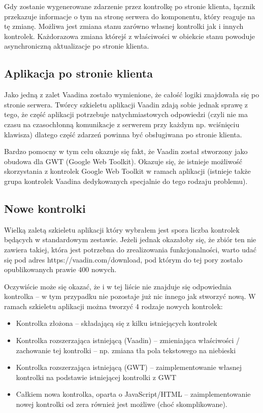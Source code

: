 Gdy zostanie wygenerowane zdarzenie przez kontrolkę po stronie klienta, łącznik przekazuje informacje o tym na stronę serwera do komponentu, który reaguje na tę zmianę. Możliwa jest zmiana stanu zarówno własnej kontrolki jak i innych kontrolek. Każdorazowa zmiana którejś z właściwości w obiekcie stanu powoduje asynchroniczną aktualizacje po stronie klienta.

\newpage
\subsection{Aplikacja po stronie klienta}
Jako jedną z zalet Vaadina zostało wymienione, że całość logiki znajdowała się po stronie serwera. Twórcy szkieletu aplikacji Vaadin zdają sobie jednak sprawę z tego, że część aplikacji potrzebuje natychmiastowych odpowiedzi (czyli nie ma czasu na czasochłonną komunikacje z serwerem przy każdym np. wciśnięciu klawisza) dlatego część zdarzeń powinna być obsługiwana po stronie klienta. 

Bardzo pomocny w tym celu okazuje się fakt, że Vaadin został stworzony jako obudowa dla GWT (Google Web Toolkit). Okazuje się, że istnieje możliwość skorzystania z kontrolek Google Web Toolkit w ramach aplikacji (istnieje także grupa kontrolek Vaadina dedykowanych specjalnie do tego rodzaju problemu).

\subsection{Nowe kontrolki}
Wielką zaletą szkieletu aplikacji który wybrałem jest spora liczba kontrolek będących w standardowym zestawie. Jeżeli jednak okazałoby się, że zbiór ten nie zawiera takiej, która jest potrzebna do zrealizowania funkcjonalności, warto udać się pod adres https://vaadin.com/download, pod którym do tej pory zostało opublikowanych prawie 400 nowych. 

Oczywiście może się okazać, że i w tej liście nie znajduje się odpowiednia kontrolka – w tym przypadku nie pozostaje już nic innego jak stworzyć nową. W ramach szkieletu aplikacji można tworzyć 4 rodzaje nowych kontrolek:
\begin{itemize}
\item Kontrolka złożona – składającą się z kilku istniejących kontrolek
\item Kontrolka rozszerzająca istniejącą (Vaadin) – zmieniająca właściwości / zachowanie tej kontrolki – np. zmiana tła pola tekstowego na niebieski
\item Kontrolka rozszerzająca istniejącą (GWT) – zaimplementowanie własnej kontrolki na podstawie istniejącej kontrolki z GWT
\item Całkiem nowa kontrolka, oparta o JavaScript/HTML – zaimplementowanie nowej kontrolki od zera również jest możliwe (choć skomplikowane).
\end{itemize}

